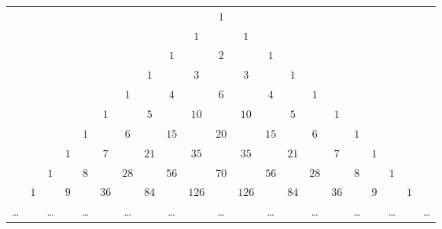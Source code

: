 {
\setlength{\tabcolsep}{3pt}
\begin{longtable}{ccccccccccccccccccccc}
           &       &        &       &        &        &        &        &        &         & \(1\)  &         &        &        &        &        &        &       &        &       &        \\
           &       &        &       &        &        &        &        &        & \(1\)   &        & \(1\)   &        &        &        &        &        &       &        &       &        \\
           &       &        &       &        &        &        &        & \(1\)  &         & \(2\)  &         & \(1\)  &        &        &        &        &       &        &       &        \\
           &       &        &       &        &        &        & \(1\)  &        & \(3\)   &        & \(3\)   &        & \(1\)  &        &        &        &       &        &       &        \\
           &       &        &       &        &        & \(1\)  &        & \(4\)  &         & \(6\)  &         & \(4\)  &        & \(1\)  &        &        &       &        &       &        \\
           &       &        &       &        & \(1\)  &        & \(5\)  &        & \(10\)  &        & \(10\)  &        & \(5\)  &        & \(1\)  &        &       &        &       &        \\
           &       &        &       & \(1\)  &        & \(6\)  &        & \(15\) &         & \(20\) &         & \(15\) &        & \(6\)  &        & \(1\)  &       &        &       &        \\
           &       &        & \(1\) &        & \(7\)  &        & \(21\) &        & \(35\)  &        & \(35\)  &        & \(21\) &        & \(7\)  &        & \(1\) &        &       &        \\
           &       & \(1\)  &       & \(8\)  &        & \(28\) &        & \(56\) &         & \(70\) &         & \(56\) &        & \(28\) &        & \(8\)  &       & \(1\)  &       &        \\
           & \(1\) &        & \(9\) &        & \(36\) &        & \(84\) &        & \(126\) &        & \(126\) &        & \(84\) &        & \(36\) &        & \(9\) &        & \(1\) &        \\
    \ldots &       & \ldots &       & \ldots &        & \ldots &        & \ldots &         & \ldots &         & \ldots &        & \ldots &        & \ldots &       & \ldots &       & \ldots \\
\end{longtable}
}

